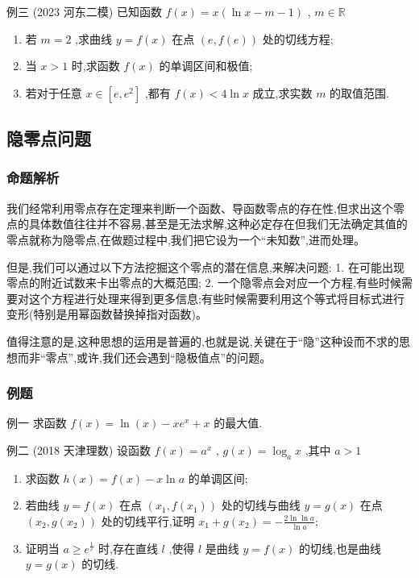 \documentclass{article}
\begin{document}
例三 (2023 河东二模) 已知函数 $f(x)=x(\ln x-m-1)$ , $m \in \mathbb{R}$
\begin{enumerate}
\item[(I)] 若 $m=2$ ,求曲线 $y=f(x)$ 在点 $(e, f(e))$ 处的切线方程;
\item[(II)] 当 $x>1$ 时,求函数 $f(x)$ 的单调区间和极值;
\item[(III)] 若对于任意 $x \in[e, e^2]$ ,都有 $f(x)<4 \ln x$ 成立,求实数 $m$ 的取值范围.
\end{enumerate}
\vspace{20\baselineskip}

\newpage
\subsection{隐零点问题}
\subsubsection{命题解析}

我们经常利用零点存在定理来判断一个函数、导函数零点的存在性,但求出这个零点的具体数值往往并不容易,甚至是无法求解,这种必定存在但我们无法确定其值的零点就称为隐零点,在做题过程中,我们把它设为一个“未知数”,进而处理。

但是,我们可以通过以下方法挖掘这个零点的潜在信息,来解决问题:
1. 在可能出现零点的附近试数来卡出零点的大概范围;
2. 一个隐零点会对应一个方程,有些时候需要对这个方程进行处理来得到更多信息;有些时候需要利用这个等式将目标式进行变形(特别是用幂函数替换掉指对函数)。

值得注意的是,这种思想的运用是普遍的,也就是说,关键在于“隐”这种设而不求的思想而非“零点”,或许,我们还会遇到“隐极值点”的问题。

\subsubsection{例题}

例一  \;求函数 $f(x)=\ln (x)-x e^x+x$ 的最大值.
\vspace{13\baselineskip}

例二 (2018 天津理数) 设函数 $f(x)=a^x$ , $g(x)=\log_a x$ ,其中 $a>1$
\begin{enumerate}
\item[(I)] 求函数 $h(x)=f(x)-x \ln a$ 的单调区间;
\item[(II)] 若曲线 $y=f(x)$ 在点 $(x_1, f(x_1))$ 处的切线与曲线 $y=g(x)$ 在点 $(x_2, g(x_2))$ 处的切线平行,证明 $x_1+g(x_2)=-\frac{2 \ln \ln a}{\ln a}$;
\item[(III)] 证明当 $a \geq e^{\frac{1}{e}}$ 时,存在直线 $l$ ,使得 $l$ 是曲线 $y=f(x)$ 的切线,也是曲线 $y=g(x)$ 的切线.
\end{enumerate}
\vspace{24\baselineskip}
\end{document}
